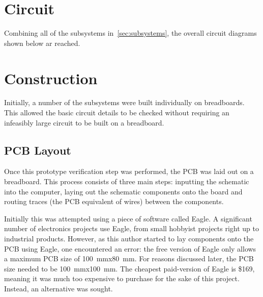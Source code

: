 


\section{Circuit}
Combining all of the subsystems in~\cref{sec:subsystems}, the overall circuit
diagrams shown below ar reached.





\section{Construction}
Initially, a number of the subsystems were built individually on breadboards.
This allowed the basic circuit details to be checked without requiring an
infeasibly large circuit to be built on a breadboard. 

\subsection{PCB Layout}
Once this prototype verification step was performed, the PCB was laid out on a
breadboard. This process consists of three main steps: inputting the schematic
into the computer, laying out the schematic components onto the board and
routing traces (the PCB equivalent of wires) between the components.

Initially this was attempted using a piece of software called Eagle. A
significant number of electronics projects use Eagle, from small hobbyist
projects right up to industrial products. However, as this author started to lay
components onto the PCB using Eagle, one encountered an error: the free version
of Eagle only allows a maximum PCB size of \SI{100}{\mm}x\SI{80}{\mm}. For
reasons discussed later, the PCB size needed to be \SI{100}{\mm}x\SI{100}{\mm}.
The cheapest paid-version of Eagle is \$169, meaning it was much too expensive
to purchase for the sake of this project. Instead, an alternative was sought.

